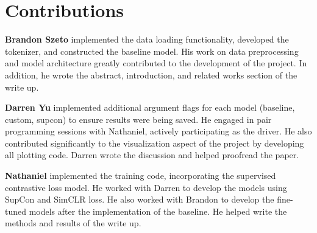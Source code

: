 \section*{Contributions}

\label{sec:contributions}

\noindent\textbf{Brandon Szeto} implemented the data loading functionality, developed the tokenizer, and constructed the baseline model. His work on data preprocessing and model architecture greatly contributed to the development of the project. In addition, he wrote the abstract, introduction, and related works section of the write up.

\noindent\textbf{Darren Yu} implemented additional argument flags for each model (baseline, custom, supcon) to ensure results were being saved. He engaged in pair programming sessions with Nathaniel, actively participating as the driver. He also contributed significantly to the visualization aspect of the project by developing all plotting code. Darren wrote the discussion and helped proofread the paper.

\noindent\textbf{Nathaniel} implemented the training code, incorporating the supervised contrastive loss model. He worked with Darren to develop the models using SupCon and SimCLR loss. He also worked with Brandon to develop the fine-tuned models after the implementation of the baseline. He helped write the methods and results of the write up.

